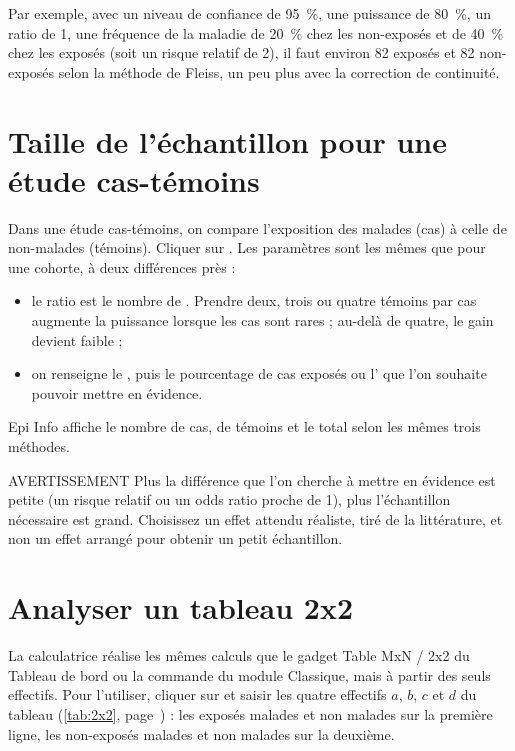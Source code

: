 Par exemple, avec un niveau de confiance de 95~\%, une puissance de 80~\%, un ratio de 1, une fréquence de la maladie de 20~\% chez les non-exposés et de 40~\% chez les exposés (soit un risque relatif de 2), il faut environ 82 exposés et 82 non-exposés selon la méthode de Fleiss, un peu plus avec la correction de continuité.

\section[Taille de l'échantillon pour une étude cas-témoins][Échantillon : étude cas-témoins]{Taille de l'échantillon pour une étude cas-témoins}

Dans une étude cas-témoins, on compare l'exposition des malades (cas) à celle de non-malades (témoins). Cliquer sur . Les paramètres sont les mêmes que pour une cohorte, à deux différences près :
\begin{itemize}
	\item le ratio est le nombre de . Prendre deux, trois ou quatre témoins par cas augmente la puissance lorsque les cas sont rares ; au-delà de quatre, le gain devient faible ;
	\item on renseigne le , puis le pourcentage de cas exposés ou l' que l'on souhaite pouvoir mettre en évidence.
\end{itemize}

Epi Info affiche le nombre de cas, de témoins et le total selon les mêmes trois méthodes.

\begin{mybox}[colbacktitle=CAUTION]{\faFire{} AVERTISSEMENT}
Plus la différence que l'on cherche à mettre en évidence est petite (un risque relatif ou un odds ratio proche de 1), plus l'échantillon nécessaire est grand. Choisissez un effet attendu réaliste, tiré de la littérature, et non un effet arrangé pour obtenir un petit échantillon.
\end{mybox}

\section{Analyser un tableau 2x2}
\label{statcalcTables}

La calculatrice  réalise les mêmes calculs que le gadget Table MxN / 2x2 du Tableau de bord ou la commande  du module Classique, mais à partir des seuls effectifs. Pour l'utiliser, cliquer sur  et saisir les quatre effectifs $a$, $b$, $c$ et $d$ du tableau (\autoref{tab:2x2}, page~\pageref{tab:2x2}) : les exposés malades et non malades sur la première ligne, les non-exposés malades et non malades sur la deuxième.

